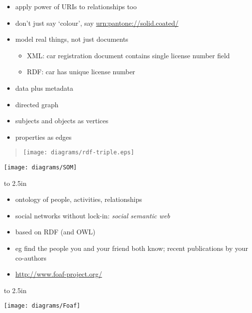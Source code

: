 \documentclass{sepslide-soa-faked} %
\begin{document}
\begin{slide}
\begin{itemize}
\item apply power of URIs to relationships too
\item don't just say `colour', say
\url{urn:pantone://solid.coated/}
\item model real things, not just documents
  \begin{itemize}
  \item XML: car registration document contains single license number field
  \item RDF: car has unique license number
  \end{itemize}
\item data plus metadata
\end{itemize}
\end{slide}

\begin{slide}
\begin{itemize}
\item directed graph
\item subjects and objects as vertices
\item properties as edges
\end{itemize}
\begin{quote}
\texttt{[image: diagrams/rdf-triple.eps]}
\end{quote}
\end{slide}

\begin{slide}
\texttt{[image: diagrams/SOM]}
\end{slide}

\begin{slide}
\begin{minipage}{0.6\textwidth}\raggedright
\vbox to 2.5in{
\begin{itemize}
\item ontology of people, activities, relationships
\item social networks without lock-in: \emph{social semantic web}
\item based on RDF (and OWL)
\item eg find the people you and your friend both know; recent publications by your co-authors
\item \url{http://www.foaf-project.org/}
\end{itemize}
\vfil}
\end{minipage}
\hfil
\begin{minipage}{0.3\textwidth}
\vbox to 2.5in{
\begin{flushright}%
\texttt{[image: diagrams/Foaf]}
\end{flushright}
\vfil}
\end{minipage}%
\end{slide}
\end{document}
